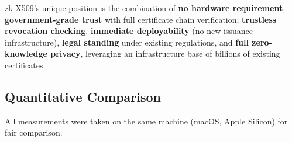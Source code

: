 \documentclass[11pt, a4paper]{article}
\begin{document}
zk-X509's unique position is the combination of \textbf{no hardware
requirement}, \textbf{government-grade trust} with full certificate
chain verification, \textbf{trustless revocation checking},
\textbf{immediate deployability} (no new issuance infrastructure),
\textbf{legal standing} under existing regulations, and \textbf{full
zero-knowledge privacy}, leveraging an infrastructure base of billions
of existing certificates.

\subsection{Quantitative
Comparison}\label{quantitative-comparison}

All measurements were taken on the same machine (macOS, Apple Silicon)
for fair comparison.
\end{document}
